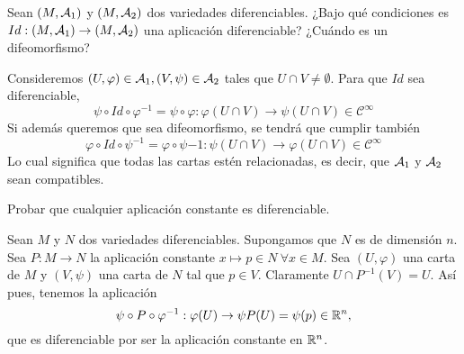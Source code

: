 \documentclass[twoside]{article}
\begin{document}
\newpage

\begin{ejercicio}{5}
Sean $(M,\mathcal{A}_1)$ y $(M,\mathcal{A}_2)$ dos variedades diferenciables. ¿Bajo qué condiciones
es $Id : (M,\mathcal{A}_1) \to (M,\mathcal{A}_2)$ una aplicación diferenciable? ¿Cuándo es un
difeomorfismo?
\end{ejercicio}
\begin{solucion}
Consideremos $(U,\varphi)\in\mathcal{A}_1, (V,\psi)\in\mathcal{A}_2$ tales que $U\cap V\neq\emptyset$. Para que $Id$ sea diferenciable, 
$$\psi\circ Id\circ\varphi^{-1}=\psi\circ\varphi:\varphi(U\cap V)\to\psi(U\cap V)\in \mathcal{C}^\infty$$
Si además queremos que sea difeomorfismo, se tendrá que cumplir también
$$\varphi\circ Id\circ\psi^{-1}=\varphi\circ\psi{-1}:\psi(U\cap V)\to\varphi(U\cap V)\in\mathcal{C}^\infty$$
Lo cual significa que todas las cartas estén relacionadas, es decir, que $\mathcal{A}_1$ y $\mathcal{A}_2$ sean compatibles.
\end{solucion}

\newpage

\begin{ejercicio}{6}
Probar que cualquier aplicación constante es diferenciable.
\end{ejercicio}
\begin{solucion}
Sean $M$ y $N$ dos variedades diferenciables. Supongamos que $N$ es de dimensión $n$. Sea $P:M\to N$ la aplicación constante $x\mapsto p\in N\ \forall x\in M$. Sea $(U,\varphi)$ una carta de $M$ y $(V,\psi)$ una carta de $N$ tal que $p\in V$. Claramente $U\cap P^{-1}(V)=U$. Así pues, tenemos la aplicación
$$\psi\circ P\circ\varphi^{-1}:\varphi(U)\to\psi P(U)=\psi(p)\in\mathbb{R}^n,$$
que es diferenciable por ser la aplicación constante en $\mathbb{R}^n$. 
\end{solucion}
\end{document}
